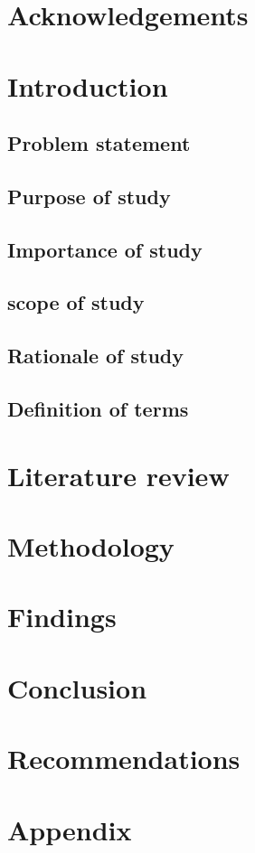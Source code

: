\documentclass[12pt,a4paper,final]{report}
\begin{document}
\chapter{Acknowledgements}


\tableofcontents
\newpage
\chapter{Introduction}

\section{Problem statement}
\section{Purpose of study}
\section{Importance of study}
\section{scope of study}
\section{Rationale of study}
\section{Definition of terms}

\chapter{Literature review}

\chapter{Methodology}

\chapter{Findings}

\chapter{Conclusion}

\chapter{Recommendations}

\mbox{}
\nocite{*}
 

\newpage
\listoffigures
\chapter{Appendix}
\end{document}
